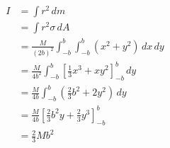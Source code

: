 \documentclass{article}
\begin{document}
\begin{align*}
  I & = \int r^2 \,d m                                                                  \\
    & = \int r^2 \sigma \,d A                                                           \\
    & = \frac{M}{(2 b)^2} \int_{-b}^b \int_{-b}^b (x^2 + y^2) \,d x \,d y               \\
    & = \frac{M}{4 b^2} \int_{-b}^b \left[ \frac{1}{3} x^3 + x y^2 \right]_{-b}^b \,d y \\
    & = \frac{M}{4 b} \int_{-b}^b \left( \frac{2}{3} b^2 + 2 y^2 \right) \,d y          \\
    & = \frac{M}{4 b} \left[ \frac{2}{3} b^2 y + \frac{2}{3} y^3 \right]_{-b}^b         \\
    & = \frac{2}{3} M b^2
\end{align*}

\setcounter{subsection}{34}
\subsection{}
\end{document}
